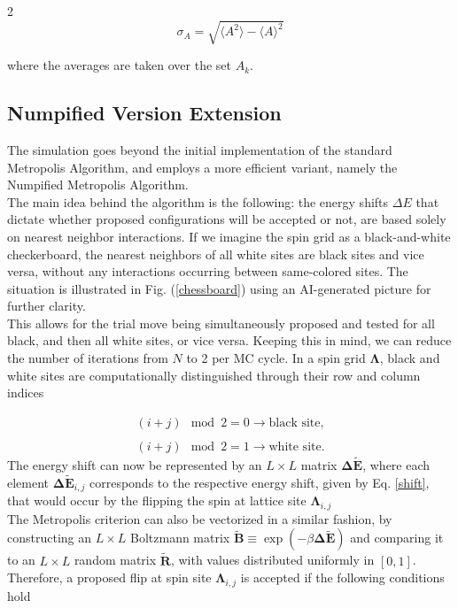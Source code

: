 \documentclass{article}
\begin{document}
\begin{multicols}{2}
\begin{equation}
    \sigma_A = \sqrt{\langle A^2 \rangle - \langle A \rangle^2} 
\end{equation}

\noindent where the averages are taken over the set $A_k$. 

\subsection{Numpified Version Extension}

The simulation goes beyond the initial implementation of the standard Metropolis Algorithm, and employs a more efficient variant, namely the Numpified Metropolis Algorithm.\\

The main idea behind the algorithm is the following: the energy shifts $\Delta E$ that dictate whether proposed configurations will be accepted or not, are based solely on nearest neighbor interactions. If we imagine the spin grid as a black-and-white checkerboard, the nearest neighbors of all white sites are black  sites and vice versa, without any interactions occurring between same-colored sites. The situation is illustrated in Fig. (\ref{chessboard}) using an AI-generated picture for further clarity.\\

This allows for the trial move being simultaneously proposed and tested for all black, and then all white sites, or vice versa. Keeping this in mind, we can reduce the number of iterations from $N$ to 2 per MC cycle. In a spin grid $\boldsymbol{\Lambda}$, black and white sites are computationally distinguished through their row and column indices

\begin{align}
    (i+j)\mod 2 = 0 \rightarrow \text{black site,} \nonumber \\
    \label{latticeselect} \\
    (i+j)\mod 2 = 1 \rightarrow \text{white site}. \nonumber
\end{align}
%
The energy shift can now be represented by an $L\times L$ matrix $\boldsymbol{\Delta \tilde{E}}$, where each element $\boldsymbol{\Delta \tilde{E}}_{i,j}$ corresponds to the respective energy shift, given by Eq. \eqref{shift}, that would occur by the flipping the spin at lattice site $\boldsymbol{\Lambda}_{i,j}$ \\

The Metropolis criterion can also be vectorized in a similar fashion, by constructing an $L\times L$ Boltzmann matrix $\boldsymbol{\tilde{B}} \equiv \exp(-\beta \boldsymbol{\Delta \tilde{E}})$ and comparing it to an $L\times L$ random matrix $\boldsymbol{\tilde{R}}$, with values distributed uniformly in $[0,1]$. Therefore, a proposed flip at spin site $\boldsymbol{\Lambda}_{i,j}$ is accepted if the following conditions hold


\end{multicols}
\end{document}
